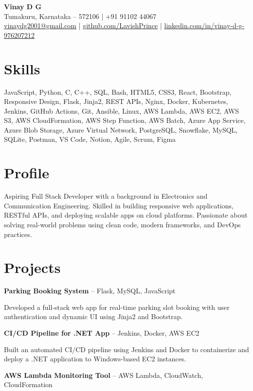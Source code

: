 \documentclass[a4paper,10pt]{article}
\begin{document}
\begin{center}
    \textbf{\Large Vinay D G} \\
    Tumakuru, Karnataka – 572106 \quad | \quad +91 91102 44067 \\
    \href{mailto:vinaydg2001@gmail.com}{vinaydg2001@gmail.com} \quad | \quad
    \href{https://github.com/LavishPrince}{github.com/LavishPrince} \quad | \quad
    \href{https://www.linkedin.com/in/vinay-d-g-976207212/}{linkedin.com/in/vinay-d-g-976207212}
\end{center}

\section*{Skills}
JavaScript, Python, C, C++, SQL, Bash, HTML5, CSS3, React, Bootstrap, Responsive Design, Flask, Jinja2, REST APIs, Nginx, Docker, Kubernetes, Jenkins, GitHub Actions, Git, Ansible, Linux, AWS Lambda, AWS EC2, AWS S3, AWS CloudFormation, AWS Step Function, AWS Batch, Azure App Service, Azure Blob Storage, Azure Virtual Network, PostgreSQL, Snowflake, MySQL, SQLite, Postman, VS Code, Notion, Agile, Scrum, Figma

\section*{Profile}
Aspiring Full Stack Developer with a background in Electronics and Communication Engineering. Skilled in building responsive web applications, RESTful APIs, and deploying scalable apps on cloud platforms. Passionate about solving real-world problems using clean code, modern frameworks, and DevOps practices.

\section*{Projects}
\textbf{Parking Booking System} – Flask, MySQL, JavaScript

Developed a full-stack web app for real-time parking slot booking with user authentication and dynamic UI using Jinja2 and Bootstrap.

\textbf{CI/CD Pipeline for .NET App} – Jenkins, Docker, AWS EC2

Built an automated CI/CD pipeline using Jenkins and Docker to containerize and deploy a .NET application to Windows-based EC2 instances.

\textbf{AWS Lambda Monitoring Tool} – AWS Lambda, CloudWatch, CloudFormation
\end{document}
